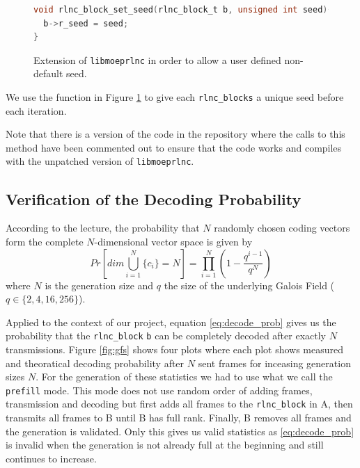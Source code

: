 \documentclass[a4paper,english,10pt]{tumarticle}
\begin{document}

\begin{figure}[h]
  \begin{lstlisting}[language=C]
void rlnc_block_set_seed(rlnc_block_t b, unsigned int seed){
  b->r_seed = seed;
}
\end{lstlisting}
  \caption[]{Extension of \texttt{libmoeprlnc} in order to allow a user defined non-default seed.}
  \label{code}
\end{figure}

We use the function in Figure \ref{code} to give each \texttt{rlnc\_blocks} a unique seed before each iteration.

Note that there is a version of the code in the repository where the calls to this method 
have been commented out to ensure that the code works and compiles with the unpatched version of \texttt{libmoeprlnc}.

\subsection{Verification of the Decoding Probability}
According to the lecture, the probability that $N$ randomly chosen coding vectors form
the complete $N$-dimensional vector space is given by %
\begin{equation} 
  Pr[dim\bigcup_{i=1}^{N}\{c_i\} = N] = \prod_{i=1}^{N} (1 - \frac{q^{i - 1}}{q ^ {N}})
  \label{eq:decode_prob}
\end{equation}
where $N$ is the generation size and $q$ the size of the underlying Galois Field ($q \in \{2,4,16,256\}$).

Applied to the context of our project, equation \eqref{eq:decode_prob} gives us
the probability that the \texttt{rlnc\_block} \texttt{b} can be completely
decoded after exactly $N$ transmissions. Figure \ref{fig:gfs} shows four plots
where each plot shows measured and theoratical decoding probability after $N$
sent frames for inceasing generation sizes $N$. For the generation of these
statistics we had to use what we call the \texttt{prefill} mode. This mode does
not use random order of adding frames, transmission and decoding but first adds
all frames to the \texttt{rlnc\_block} in A, then transmits all frames to B
until B has full rank. Finally, B removes all frames and the generation is
validated. Only this gives us valid statistics as \eqref{eq:decode_prob} is
invalid when the generation is not already full at the beginning and still
continues to increase.
\end{document}
